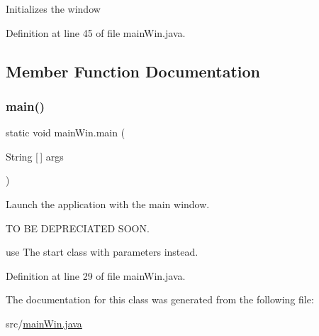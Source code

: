 Initializes the window 

Definition at line 45 of file main\+Win.\+java.



\subsection{Member Function Documentation}
\mbox{\label{classmain_win_a8fcc6dd4f93af4dd5a72a74c461a1fe0}} 
\subsubsection{\texorpdfstring{main()}{main()}}
{\footnotesize\ttfamily static void main\+Win.\+main (\begin{DoxyParamCaption}\item[{String \mbox{[}$\,$\mbox{]}}]{args }\end{DoxyParamCaption})\hspace{0.3cm}{\ttfamily [static]}}

Launch the application with the main window.

TO BE D\+E\+P\+R\+E\+C\+I\+A\+T\+ED S\+O\+ON.

use The start class with parameters instead. 

Definition at line 29 of file main\+Win.\+java.



The documentation for this class was generated from the following file\+:\begin{DoxyCompactItemize}
\item 
src/\hyperlink{main_win_8java}{main\+Win.\+java}\end{DoxyCompactItemize}
